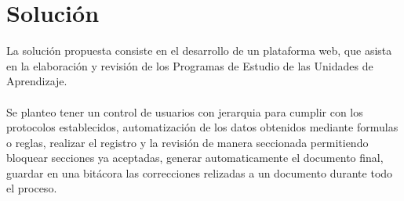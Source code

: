 \section{Solución}
La solución propuesta consiste en el desarrollo de un plataforma web, que asista en la elaboración y revisión de los Programas de Estudio de las Unidades de Aprendizaje.\\
\\
Se planteo tener un control de usuarios con jerarquia para cumplir con los protocolos establecidos, automatización de los datos obtenidos mediante formulas o reglas, realizar el registro y la revisión de manera seccionada permitiendo bloquear secciones ya aceptadas, generar automaticamente el documento final, guardar en una bitácora las correcciones relizadas a un documento durante todo el proceso.